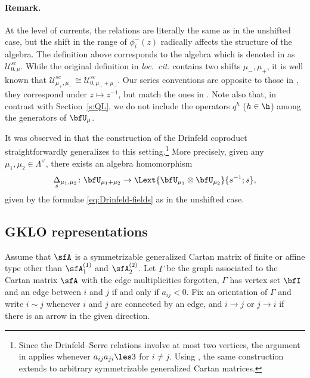 \documentclass[reqno]{amsart}
\numberwithin{equation}{section}
\newenvironment{remark}{\medskip\paragraph{{\bf Remark.}}}{\par\medskip}
\begin{document}
\begin{remark}
	At the level of currents, the relations are literally the same as in the unshifted case, but 
	the shift in the range of $\phi_i^{-}(z)$ radically affects the structure of the algebra. 
	The definition above corresponds to the algebra which is denoted in \cite[Sec.~5]{FT19} 
	as $\mathcal{U}_{0,\mu}^{sc}$. 
	While the original definition in \emph{loc.\ cit.} contains two shifts $\mu_-, \mu_+$, it is 
	well known that $\mathcal{U}_{\mu_+,\mu_-}^{sc} \cong \mathcal{U}_{0,\mu_+ + 
		\mu_-}^{sc}$. Our series conventions are opposite to those in \cite{FT19}, \ie they 
	correspond under $z\mapsto z^{-1}$, but match the ones in \cite{hernandez-05}. 
	Note also that, in contrast with Section~\ref{s:QL}, we do not include the operators $q^h$ ($h\in\h$) among the generators of $\bfU_\mu$.
	\hfill\rmkend
\end{remark}

It was observed in \cite[Sec.~10(i)]{FT19} that the construction of the Drinfeld coproduct straightforwardly generalizes to this setting.\footnote{Since the Drinfeld--Serre relations involve at most two vertices, the argument in \cite[Sec.~10(i)]{FT19} applies whenever $a_{ij}a_{ji}\les3$ for $i\neq j$. Using \cite[Thm.~6.16]{damiani-24}, the same construction extends to arbitrary symmetrizable generalized Cartan matrices.}
More precisely, given any $\mu_1, \mu_2 \in \Lambda^\vee$, there exists an algebra homomorphism
\[
\DDs \colon \bfU_{\mu_1 + \mu_2} \to \Lext{\bfU_{\mu_1} \otimes \bfU_{\mu_2}}{s^{-1};s}, 
\]
given by the formulae \eqref{eq:Drinfeld-fields} as in the unshifted case. 

\subsection{GKLO representations} 

Assume that $\sfA$ is a symmetrizable generalized Cartan matrix of finite or affine type other than $\sfA_1^{(1)}$ and $\sfA_2^{(2)}$.  
Let $\Gamma$ be the graph associated to the Cartan matrix 
$\sfA$ with the edge multiplicities forgotten, \ie $\Gamma$ has vertex set $\bfI$ and an edge between $i$ and $j$ if and only if $a_{ij}<0$.
Fix an orientation of $\Gamma$ and write $i \sim j$ whenever $i$ and $j$ are connected 
by an edge, and $i \to j$ or $j \to i$ if there is an arrow in the given direction.
\end{document}
